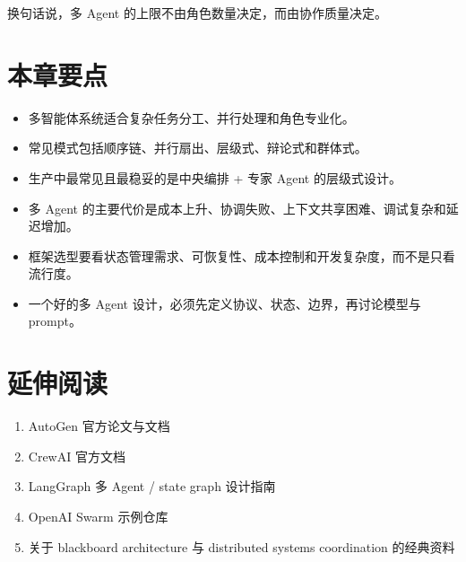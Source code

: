 换句话说，多 Agent 的上限不由角色数量决定，而由协作质量决定。


\section{本章要点}

\begin{itemize}[leftmargin=2em]
\item 多智能体系统适合复杂任务分工、并行处理和角色专业化。
\item 常见模式包括顺序链、并行扇出、层级式、辩论式和群体式。
\item 生产中最常见且最稳妥的是中央编排 + 专家 Agent 的层级式设计。
\item 多 Agent 的主要代价是成本上升、协调失败、上下文共享困难、调试复杂和延迟增加。
\item 框架选型要看状态管理需求、可恢复性、成本控制和开发复杂度，而不是只看流行度。
\item 一个好的多 Agent 设计，必须先定义协议、状态、边界，再讨论模型与 prompt。
\end{itemize}

\section{延伸阅读}

\begin{enumerate}[leftmargin=2em]
\item AutoGen 官方论文与文档
\item CrewAI 官方文档
\item LangGraph 多 Agent / state graph 设计指南
\item OpenAI Swarm 示例仓库
\item 关于 blackboard architecture 与 distributed systems coordination 的经典资料
\end{enumerate}

